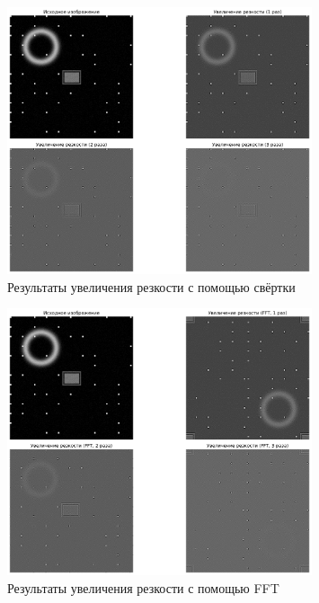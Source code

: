 \begin{figure}[H]
    \centering
    \includegraphics[width=0.8\textwidth]{images/task3/convolution_results.png}
    \caption{Результаты увеличения резкости с помощью свёртки}
    \label{fig:convolution_sharp}
\end{figure}

\begin{figure}[H]
    \centering
    \includegraphics[width=0.8\textwidth]{images/task3/fft_results.png}
    \caption{Результаты увеличения резкости с помощью FFT}
    \label{fig:fft_sharp}
\end{figure}

